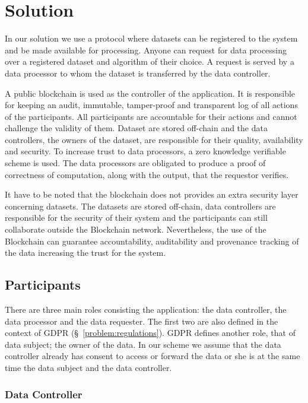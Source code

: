 \chapter{Solution}
\label{solution}

In our solution we use a protocol where datasets can be registered to the system and be made available for processing. Anyone can request for data processing over a registered dataset and algorithm of their choice. A request is served by a data processor to whom the dataset is transferred by the data controller.

A public blockchain is used as the controller of the application. It is responsible for keeping an audit, immutable, tamper-proof and transparent log of all actions of the participants. All participants are accountable for their actions and cannot challenge the validity of them. Dataset are stored off-chain and the data controllers, the owners of the dataset, are responsible for their quality, availability and security. To increase trust to data processors, a zero knowledge verifiable scheme is used. The data processors are obligated to produce a proof of correctness of computation, along with the output, that the requestor verifies.

It have to be noted that the blockchain does not provides an extra security layer concerning datasets. The datasets are stored off-chain, data controllers are responsible for the security of their system and the participants can still collaborate outside the Blockchain network. Nevertheless, the use of the Blockchain can guarantee accountability, auditability and provenance tracking of the data increasing the trust for the system.

\section{Participants}
\label{solution:entities}

There are three main roles consisting the application: the data controller, the data processor
and the data requester. The first two are also defined in the context of GDPR (§~\ref{problem:regulations}).
GDPR defines another role, that of data subject; the owner of the data.
In our scheme we assume that the data controller already has consent to access or forward the data or she is at the same time the data subject and the data controller.

\subsection{Data Controller}
\label{solution:entities:data_controller}

